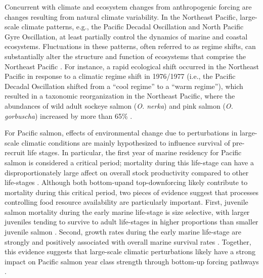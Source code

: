 Concurrent with climate and ecosystem changes from anthropogenic forcing are
changes resulting from natural climate variability. In the Northeast Pacific,
large-scale climate patterns, e.g., the Pacific Decadal Oscillation and North
Pacific Gyre Oscillation, at least partially control the dynamics of marine and
coastal ecosystems. Fluctuations in these patterns, often referred to as regime
shifts, can substantially alter the structure and function of ecosystems that
comprise the Northeast Pacific \citep{Chavez2003a}. For instance, a rapid
ecological shift occurred in the Northeast Pacific in response to a climatic
regime shift in 1976/1977 (i.e., the Pacific Decadal Oscillation shifted from a
``cool regime'' to a ``warm regime''), which resulted in a taxonomic
reorganization in the Northeast Pacific, where the abundances of wild adult
sockeye salmon (\emph{O. nerka}) and pink salmon (\emph{O. gorbuscha}) increased
by more than 65\% \citep{Ruggerone2010a, Anderson1999a, Mueter2000a}.

For Pacific salmon, effects of environmental change due to perturbations in
large-scale climatic conditions are mainly hypothesized to influence survival of
pre-recruit life stages. In particular, the first year of marine residency for
Pacific salmon is considered a critical period; mortality during this
life-stage can have a disproportionately large affect on overall stock
productivity compared to other life-stages \citep{Parker1968a, Peterman1985a,
Beamish2001a, Wertheimer2007a}. Although both bottom-up\footnotemark[2] and
top-down\footnotemark[3] forcing likely contribute to mortality during this
critical period, two pieces of evidence suggest that processes controlling food
resource availability are particularly important. First, juvenile salmon
mortality during the early marine life-stage is size selective, with larger
juveniles tending to survive to adult life-stages in higher proportions than
smaller juvenile salmon \citep{Parker1971a, Holtby1990a, McGurk1996a, Moss2005a,
Howard2016}. Second, growth rates during the early marine life-stage are
strongly and positively associated with overall marine survival rates
\citep{Cross2008a, Duffy2011, Farley2007b}. Together, this evidence suggests
that large-scale climatic perturbations likely have a strong impact on Pacific
salmon year class strength through bottom-up forcing pathways \citep{Perry1996a,
Armstrong2005a}.


